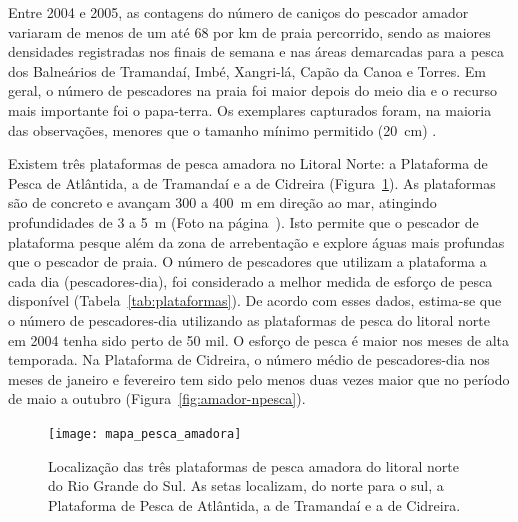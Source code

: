 \documentclass[a4paper,11pt,twoside,showtrims,onecolumn,openright,final]{memoir}
\begin{document}
Entre 2004 e 2005, as contagens do número de caniços do pescador amador variaram de menos de um 
até 68 por km de praia percorrido, sendo as maiores densidades registradas nos finais de semana e nas áreas 
demarcadas para a pesca dos Balneários de Tramandaí, Imbé, Xangri-lá, Capão da Canoa e Torres. Em geral, o 
número de pescadores na praia foi maior depois do meio dia e o recurso mais importante foi 
o papa-terra. Os exemplares capturados foram, na maioria das observações, menores que o 
tamanho mínimo permitido (20~cm) \citep{ibama2003c}. 

Existem três plataformas de pesca amadora no Litoral Norte: a Plataforma de Pesca de Atlântida, 
a de Tramandaí e a de Cidreira (Figura~\ref{fig:mapa-plataformas-pesca-amadora}). %
As plataformas são de concreto e avançam 
300 a 400~m em direção ao mar, atingindo profundidades de 3 a 5~m (Foto na página~\pageref{chap:pesca-amadora}). 
Isto permite que o pescador de plataforma pesque além da zona de arrebentação e explore águas mais profundas 
que o pescador de praia. O número de pescadores que utilizam a plataforma a cada dia (pescadores-dia),
foi considerado a melhor medida de esforço de pesca disponível (Tabela~\ref{tab:plataformas}).
De acordo com esses dados, estima-se que o número de pescadores-dia 
utilizando as plataformas de pesca do litoral norte em 2004 tenha sido perto de 50 mil. 
O esforço de pesca é maior nos meses de alta temporada. Na Plataforma de Cidreira, o número 
médio de pescadores-dia nos meses de janeiro e fevereiro tem sido pelo menos duas vezes maior 
que no período de maio a outubro (Figura~\ref{fig:amador-npesca}). 

%
%

\begin{figure}
\begin{center}
\texttt{[image: mapa\_pesca\_amadora]}
\end{center}
\caption[Localização das três plataformas de pesca amadora do litoral norte do Rio Grande do Sul]
        {Localização das três plataformas de pesca amadora do litoral norte do Rio Grande do Sul.
         As setas localizam, do norte para o sul, a Plataforma de Pesca de Atlântida, a de Tramandaí 
         e a de Cidreira.}
\label{fig:mapa-plataformas-pesca-amadora}
\end{figure}



%
%
\end{document}
